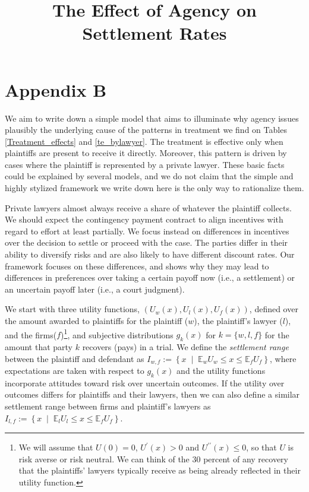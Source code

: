 \newpage
\section*{Appendix B}
\label{appendix_b}
\setcounter{table}{0}
\renewcommand{\thetable}{B.\arabic{table}} 
\setcounter{figure}{0}
\renewcommand{\thefigure}{B.\arabic{figure}} 

\title{\Large{\textbf{The Effect of Agency on Settlement Rates}}}

We aim to write down a simple model that aims to illuminate why agency issues plausibly the underlying cause of the patterns in treatment we find on Tables \ref{Treatment_effects} and \ref{te_bylawyer}. The treatment is effective only when plaintiffs are present to receive it directly. Moreover, this pattern is driven by cases where the plaintiff is represented by a private lawyer. These basic facts could be explained by several models, and we do not claim that the simple and highly stylized framework we write down here is the only way to rationalize them.

Private lawyers almost always receive a share of whatever the plaintiff collects. We should expect the contingency payment contract to align incentives with regard to effort at least partially. We focus instead on differences in incentives over the decision to settle or proceed with the case.  The parties differ in their ability to diversify risks and are also likely to have different discount rates. Our framework focuses on these differences, and shows why they may lead to differences in preferences over taking a certain payoff now (i.e., a settlement) or an uncertain payoff later (i.e., a court judgment). 

 We start with three utility functions, $\left(U_w(x), U_l(x), U_f(x)\right)$, defined over the amount awarded to plaintiffs for the plaintiff ($w$), the plaintiff's lawyer ($l$), and the firms($f$)\footnote{We will assume that $U(0)=0$, $U^{\prime}(x)>0$ and $U^{\prime\prime}(x)\leq 0$, so that $U$ is risk averse or risk neutral. We can think of the 30 percent of any recovery that the plaintiffs' lawyers typically receive as being already reflected in their utility function.}, and subjective distributions $g_k(x)$ for $k=\{w,l,f\}$ for the amount that party $k$ recovers (pays) in a trial. We define the \emph{settlement range} between the plaintiff and defendant as $I_{w,f}:=\left\{x\;\;|\;\;\mathbb{E}_wU_w\leq x\leq\mathbb{E}_fU_f\right\}$, where expectations are taken with respect to $g_k(x)$ and the utility functions incorporate attitudes toward risk over uncertain outcomes. If the utility over outcomes differs for plaintiffs and their lawyers, then we can also define a similar settlement range between firms and plaintiff's lawyers as $I_{l,f}:=\left\{x\;\;|\;\;\mathbb{E}_lU_l\leq x\leq\mathbb{E}_fU_f\right\}$. 

